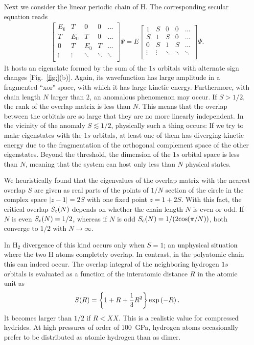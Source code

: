 \documentclass[twocolumn,showpacs,prb,amsfonts,amsmath,amssymb,floatfix,groupedaddress]{revtex4-1}
\begin{document}
Next we consider the linear periodic chain of H. The corresponding secular equation reads
\begin{eqnarray}
\left[
\begin{array}{ccccc}
E_{0} & T & 0 & 0& \dots \\
T & E_{0} & T & 0 &\dots \\
0 & T & E_{0} & T & \dots \\
\vdots & \vdots & \ddots & \ddots & \ddots \\
\end{array}
\right]
\Psi
=
E
\left[
\begin{array}{ccccc}
1 & S & 0 & 0& \dots \\
S & 1 & S & 0 &\dots \\
0 & S & 1 & S & \dots \\
\vdots & \vdots & \ddots & \ddots & \ddots \\
\end{array}
\right]
\Psi
.
\end{eqnarray}
It hosts an eigenstate formed by the sum of the $1s$ orbitals with alternate sign changes [Fig.~\ref{fig:}(b)]. Again, its wavefunction has large amplitude in a fragmented ``xor" space, with which it has large kinetic energy. Furthermore, with chain length $N$ larger than 2, an anomalous phenomenon may occur. If $S>1/2$, the rank of the overlap matrix is less than $N$. This means that the overlap between the orbitals are so large that they are no more linearly independent. In the vicinity of the anomaly $S\lesssim 1/2$, physically such a thing occurs: If we try to make eigenstates with the $1s$ orbitals, at least one of them has diverging kinetic energy due to the fragmentation of the orthogonal complement space of the other eigenstates. Beyond the threshold, the dimension of the $1s$ orbital space is less than $N$, meaning that the system can host only less than $N$ physical states.

We heuristically found that the eigenvalues of the overlap matrix with the nearest overlap $S$ are given as real parts of the points of $1/N$ section of the circle in the complex space $|z-1|=2S$ with one fixed point $z=1+2S$. With this fact, the critical overlap $S_{\rm c}(N)$ depends on whether the chain length $N$ is even or odd. If $N$ is even $S_{\rm c}(N)=1/2$, whereas if $N$ is odd $S_{\rm c}(N)=1/(2{\rm cos}(\pi/N))$, both converge to $1/2$ with $N\rightarrow \infty$.

In H$_{2}$ divergence of this kind occurs only when $S=1$; an unphysical situation where the two H atoms completely overlap. In contrast, in the polyatomic chain this can indeed occur. The overlap integral of the neighboring hydrogen $1s$ orbitals is evaluated as a function of the interatomic distance $R$ in the atomic unit as
\begin{eqnarray}
S(R)
=
\left\{
1+
R+
\frac{1}{3}
R^2
\right\}
{\rm exp}
\left(-R
\right)
.
\end{eqnarray}
It becomes larger than $1/2$ if $R<XX$. This is a realistic value for compressed hydrides. At high pressures of order of 100~GPa, hydrogen atoms occasionally prefer to be distributed as atomic hydrogen than as dimer.
\end{document}
